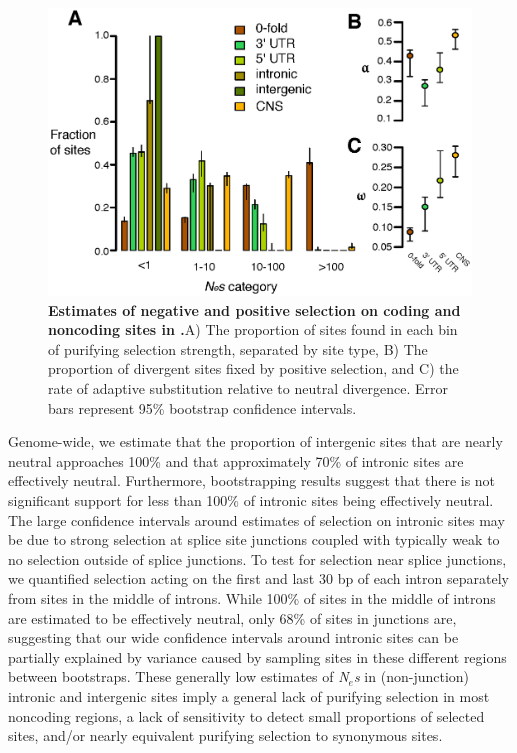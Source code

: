 \begin{figure}[ht!]
      \centering
       \includegraphics[scale=0.8]{Ch2Fig1}
    \caption{\textbf{Estimates of negative and positive selection on coding and noncoding sites in .}A) The proportion of sites found in each bin of purifying selection strength, separated by site type, B) The proportion of divergent sites fixed by positive selection, and C) the rate of adaptive substitution relative to neutral divergence. Error bars represent 95\% bootstrap confidence intervals.}
    \label{fig:fig1}
\end{figure}

Genome-wide, we estimate that the proportion of intergenic sites that are nearly neutral approaches 100\% and that approximately 70\% of intronic sites are effectively neutral. Furthermore, bootstrapping results suggest that there is not significant support for less than 100\% of intronic sites being effectively neutral. The large confidence intervals around estimates of selection on intronic sites may be due to strong selection at splice site junctions \citep{Haudry2013-qe} coupled with typically weak to no selection outside of splice junctions. To test for selection near splice junctions, we quantified selection acting on the first and last 30 bp of each intron separately from sites in the middle of introns. While 100\% of sites in the middle of introns are estimated to be effectively neutral, only 68\% of sites in junctions are, suggesting that our wide confidence intervals around intronic sites can be partially explained by variance caused by sampling sites in these different regions between bootstraps. These generally low estimates of \textit{N$_{e}$s} in (non-junction) intronic and intergenic sites imply a general lack of purifying selection in most noncoding regions, a lack of sensitivity to detect small proportions of selected sites, and/or nearly equivalent purifying selection to synonymous sites. 

